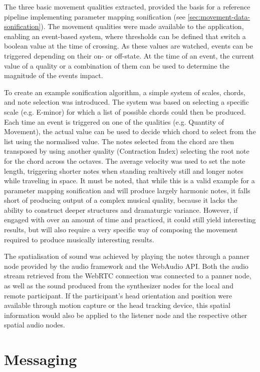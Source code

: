 The three basic movement qualities extracted, provided the basis for a reference pipeline implementing parameter mapping sonification (see \autoref{sec:movement-data-sonification}).
The movement qualities were made available to the application, enabling an event-based system, where thresholds can be defined that switch a boolean value at the time of crossing.
As these values are watched, events can be triggered depending on their on- or off-state.
At the time of an event, the current value of a quality or a combination of them can be used to determine the magnitude of the event\textquotesingle s impact.

To create an example sonification algorithm, a simple system of scales, chords, and note selection was introduced.
The system was based on selecting a specific scale (e.g. E-minor) for which a list of possible chords could then be produced.
Each time an event is triggered on one of the qualities (e.g. Quantity of Movement), the actual value can be used to decide which chord to select from the list using the normalised value.
The notes selected from the chord are then transposed by using another quality (Contraction Index) selecting the root note for the chord across the octaves.
The average velocity was used to set the note length, triggering shorter notes when standing realtively still and longer notes while traveling in space.
It must be noted, that while this is a valid example for a parameter mapping sonification and will produce largely harmonic notes, it falls short of producing output of a complex musical quality, because it lacks the ability to construct deeper structures and dramaturgic variance.
However, if engaged with over an amount of time and practiced, it could still yield interesting results, but will also require a very specific way of composing the movement required to produce musically interesting results.

The spatialisation of sound was achieved by playing the notes through a panner node provided by the audio framework and the WebAudio \ac{API}.
Both the audio stream retrieved from the \ac{WebRTC} connection was connected to a panner node, as well as the sound produced from the synthesizer nodes for the local and remote participant.
If the participant's head orientation and position were available through motion capture or the head tracking device, this spatial information would also be applied to the listener node and the respective other spatial audio nodes.

\section{Messaging}
\label{sec:messaging}

